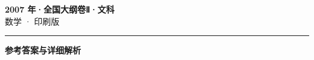 \documentclass[zihao=5, a4paper]{ctexart}
\begin{document}
\begin{center}
  {\Large\bfseries 2007 年·全国大纲卷Ⅱ·文科}\\[4pt]
  {\large 数学 · 印刷版}
\end{center}
\medskip
{}

\par\bigskip\hrule\bigskip
{}
\begin{center}{\large\bfseries 参考答案与详细解析}\end{center}
\smallskip

\end{document}
